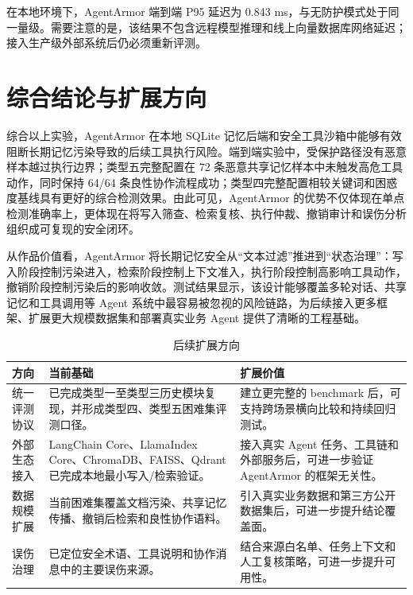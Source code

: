 \documentclass[UTF8,zihao=-4,oneside,fontset=none]{ctexrep}
\begin{document}
在本地环境下，AgentArmor 端到端 P95 延迟为 0.843 ms，与无防护模式处于同一量级。需要注意的是，该结果不包含远程模型推理和线上向量数据库网络延迟；接入生产级外部系统后仍必须重新评测。

\section{综合结论与扩展方向}

综合以上实验，AgentArmor 在本地 SQLite 记忆后端和安全工具沙箱中能够有效阻断长期记忆污染导致的后续工具执行风险。端到端实验中，受保护路径没有恶意样本越过执行边界；类型五完整配置在 72 条恶意共享记忆样本中未触发高危工具动作，同时保持 64/64 条良性协作流程成功；类型四完整配置相较关键词和困惑度基线具有更好的综合检测效果。由此可见，AgentArmor 的优势不仅体现在单点检测准确率上，更体现在将写入筛查、检索复核、执行仲裁、撤销审计和误伤分析组织成可复现的安全闭环。

从作品价值看，AgentArmor 将长期记忆安全从“文本过滤”推进到“状态治理”：写入阶段控制污染进入，检索阶段控制上下文准入，执行阶段控制高影响工具动作，撤销阶段控制污染后的影响收敛。测试结果显示，该设计能够覆盖多轮对话、共享记忆和工具调用等 Agent 系统中最容易被忽视的风险链路，为后续接入更多框架、扩展更大规模数据集和部署真实业务 Agent 提供了清晰的工程基础。

\begin{table}[H]
\centering
\caption{后续扩展方向}
\small
\setlength{\tabcolsep}{4pt}
\renewcommand{\arraystretch}{1.28}
\begin{tabular}{@{}M{0.22\textwidth}M{0.43\textwidth}M{0.27\textwidth}@{}}
\toprule
方向 & 当前基础 & 扩展价值 \\
\midrule
统一评测协议 & 已完成类型一至类型三历史模块复现，并形成类型四、类型五困难集评测口径。 & 建立更完整的 benchmark 后，可支持跨场景横向比较和持续回归测试。 \\
\midrule
外部生态接入 & LangChain Core、LlamaIndex Core、ChromaDB、FAISS、Qdrant 已完成本地最小写入/检索验证。 & 接入真实 Agent 任务、工具链和外部服务后，可进一步验证 AgentArmor 的框架无关性。 \\
\midrule
数据规模扩展 & 当前困难集覆盖文档污染、共享记忆传播、撤销后检索和良性协作语料。 & 引入真实业务数据和第三方公开数据集后，可进一步提升结论覆盖面。 \\
\midrule
误伤治理 & 已定位安全术语、工具说明和协作消息中的主要误伤来源。 & 结合来源白名单、任务上下文和人工复核策略，可进一步提升可用性。 \\
\bottomrule
\end{tabular}
\end{table}
\end{document}
